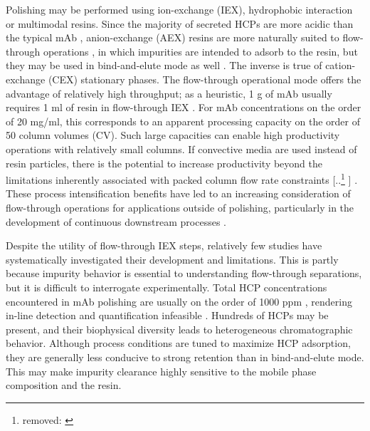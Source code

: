 \documentclass[preprint,review,12pt]{elsarticle}
\providecommand{\DIFaddtex}[1]{{\protect\color{blue} \sf #1}} %
\providecommand{\DIFdeltex}[1]{{\protect\color{red} [..\footnote{removed: #1} ]}} %
\providecommand{\DIFaddbegin}{} %
\providecommand{\DIFaddend}{} %
\providecommand{\DIFdelbegin}{} %
\providecommand{\DIFdelend}{} %
\providecommand{\DIFadd}[1]{\texorpdfstring{\DIFaddtex{#1}}{#1}} %
\providecommand{\DIFdel}[1]{\texorpdfstring{\DIFdeltex{#1}}{}} %
\begin{document}
    Polishing may be performed using ion-exchange (IEX), hydrophobic interaction or multimodal resins. Since the majority of secreted HCPs are more acidic than the typical mAb \cite{Jin2010}, anion-exchange (AEX) resins are more naturally suited to flow-through operations \cite{Kelley2008a}, in which impurities are intended to adsorb to the resin, but they may be used in bind-and-elute mode as well \cite{Liu2010a}. The inverse is true of cation-exchange (CEX) stationary phases. The flow-through operational mode offers the advantage of relatively high throughput; as a heuristic, 1 g of mAb usually requires 1 ml of resin in flow-through IEX \cite{Ichihara2018}. For mAb concentrations on the order of 20 mg/ml, this corresponds to an apparent processing capacity on the order of 50 column volumes (CV). Such large capacities can enable high productivity operations with relatively small columns. If convective media are used instead of resin particles, there is the potential to increase productivity beyond the limitations inherently associated with packed column flow rate constraints \DIFdelbegin \DIFdel{\cite{Schwellenbach2016}}\DIFdelend \DIFaddbegin \DIFadd{\cite{Schwellenbach2016, Trnovec2020}}\DIFaddend . These process intensification benefits have led to an increasing consideration of flow-through operations for applications outside of polishing, particularly in the development of continuous downstream processes \cite{Ichihara2018, Ichihara2019, Khanal2021}.

    Despite the utility of flow-through IEX steps, relatively few studies have systematically investigated their development and limitations. This is partly because impurity behavior is essential to understanding flow-through separations, but it is difficult to interrogate experimentally. Total HCP concentrations encountered in mAb polishing are usually on the order of 1000 ppm \cite{Zhang2014}, rendering in-line detection and quantification infeasible \cite{Hasegawa2020_1, Hasegawa2020_2}. Hundreds of HCPs may be present, and their biophysical diversity leads to heterogeneous chromatographic behavior. Although process conditions are tuned to maximize HCP adsorption, they are generally less conducive to strong retention than in bind-and-elute mode. This may make impurity clearance highly sensitive to the mobile phase composition and the resin.
\end{document}
